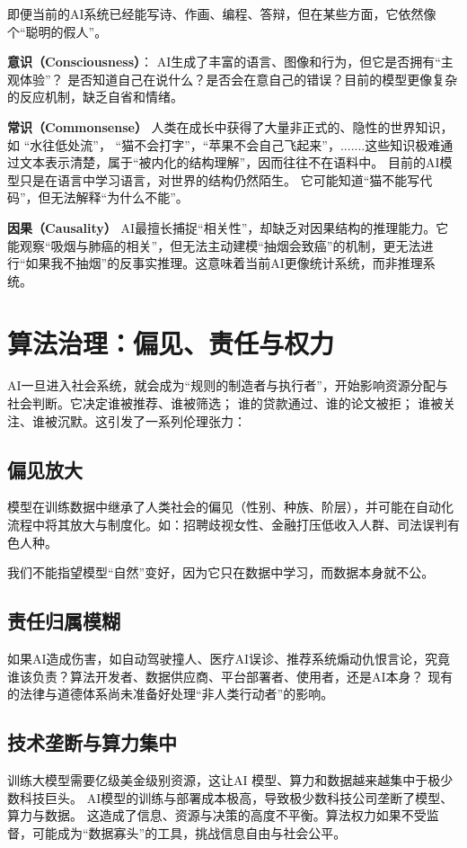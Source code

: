 即便当前的AI系统已经能写诗、作画、编程、答辩，但在某些方面，它依然像个“聪明的假人”。

\textbf{意识（Consciousness）}：
AI生成了丰富的语言、图像和行为，但它是否拥有“主观体验”？  
是否知道自己在说什么？是否会在意自己的错误？目前的模型更像复杂的反应机制，缺乏自省和情绪。  

\textbf{常识（Commonsense）}
人类在成长中获得了大量非正式的、隐性的世界知识，如 “水往低处流”， “猫不会打字”，“苹果不会自己飞起来”，.......这些知识极难通过文本表示清楚，属于“被内化的结构理解”，因而往往不在语料中。
目前的AI模型只是在语言中学习语言，对世界的结构仍然陌生。 它可能知道“猫不能写代码”，但无法解释“为什么不能”。

\textbf{因果（Causality）}
AI最擅长捕捉“相关性”，却缺乏对因果结构的推理能力。它能观察“吸烟与肺癌的相关”，但无法主动建模“抽烟会致癌”的机制，更无法进行“如果我不抽烟”的反事实推理。这意味着当前AI更像统计系统，而非推理系统。

\section{算法治理：偏见、责任与权力}

AI一旦进入社会系统，就会成为“规则的制造者与执行者”，开始影响资源分配与社会判断。它决定谁被推荐、谁被筛选； 谁的贷款通过、谁的论文被拒； 谁被关注、谁被沉默。这引发了一系列伦理张力：

\subsection*{偏见放大}
模型在训练数据中继承了人类社会的偏见（性别、种族、阶层），并可能在自动化流程中将其放大与制度化。如：招聘歧视女性、金融打压低收入人群、司法误判有色人种。

我们不能指望模型“自然”变好，因为它只在数据中学习，而数据本身就不公。

\subsection*{责任归属模糊}
如果AI造成伤害，如自动驾驶撞人、医疗AI误诊、推荐系统煽动仇恨言论，究竟谁该负责？算法开发者、数据供应商、平台部署者、使用者，还是AI本身？
现有的法律与道德体系尚未准备好处理“非人类行动者”的影响。

\subsection*{技术垄断与算力集中}
训练大模型需要亿级美金级别资源，这让AI 模型、算力和数据越来越集中于极少数科技巨头。
AI模型的训练与部署成本极高，导致极少数科技公司垄断了模型、算力与数据。
这造成了信息、资源与决策的高度不平衡。算法权力如果不受监督，可能成为“数据寡头”的工具，挑战信息自由与社会公平。

